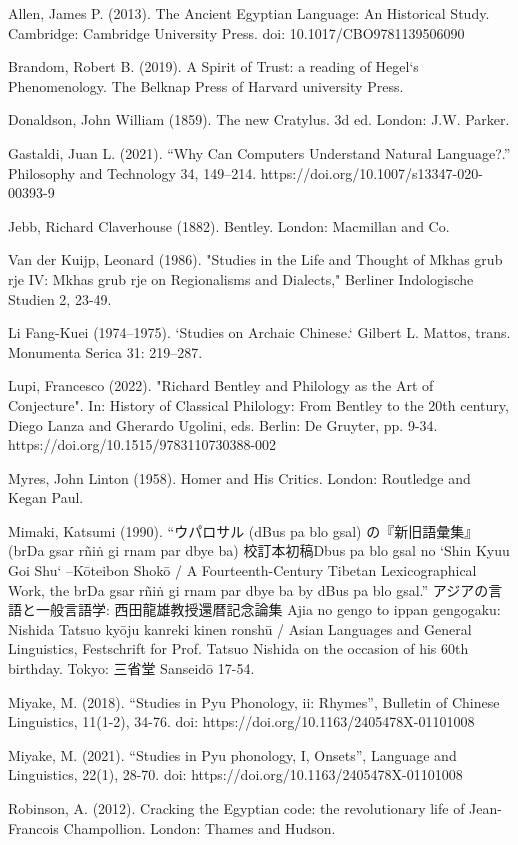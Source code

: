 Allen, James P. (2013). The Ancient Egyptian Language: An Historical Study. Cambridge: Cambridge University Press. doi: 10.1017/CBO9781139506090

Brandom, Robert B. (2019). A Spirit of Trust: a reading of Hegel`s Phenomenology. The Belknap Press of Harvard university Press.  

Donaldson, John William (1859). The new Cratylus. 3d ed. London: J.W. Parker.

Gastaldi, Juan L. (2021). “Why Can Computers Understand Natural Language?.” Philosophy and Technology 34, 149–214. https://doi.org/10.1007/s13347-020-00393-9

Jebb, Richard Claverhouse (1882). Bentley. London: Macmillan and Co.

Van der Kuijp, Leonard (1986). "Studies in the Life and Thought of Mkhas grub rje IV: Mkhas grub rje on Regionalisms and Dialects," Berliner Indologische Studien 2, 23-49.

Li Fang-Kuei (1974–1975). `Studies on Archaic Chinese.` Gilbert L. Mattos, trans. Monumenta Serica 31: 219–287.

Lupi, Francesco (2022). "Richard Bentley and Philology as the Art of Conjecture". In: History of Classical Philology: From Bentley to the 20th century, Diego Lanza and Gherardo Ugolini, eds. Berlin: De Gruyter, pp. 9-34. https://doi.org/10.1515/9783110730388-002

Myres, John Linton (1958). Homer and His Critics. London: Routledge and Kegan Paul. 

Mimaki, Katsumi (1990). “ウパロサル (dBus pa blo gsal) の『新旧語彙集』(brDa gsar rñiṅ gi rnam par dbye ba) 校訂本初稿Dbus pa blo gsal no `Shin Kyuu Goi Shu` –Kōteibon Shokō / A Fourteenth-Century Tibetan Lexicographical Work, the brDa gsar rñiṅ gi rnam par dbye ba by dBus pa blo gsal.” アジアの言語と一般言語学: 西田龍雄教授還暦記念論集 Ajia no gengo to ippan gengogaku: Nishida Tatsuo kyōju kanreki kinen ronshū / Asian Languages and General Linguistics, Festschrift for Prof. Tatsuo Nishida on the occasion of his 60th birthday. Tokyo: 三省堂 Sanseidō 17-54.

Miyake, M. (2018). “Studies in Pyu Phonology, ii: Rhymes”, Bulletin of Chinese Linguistics, 11(1-2), 34-76. doi: https://doi.org/10.1163/2405478X-01101008

Miyake, M. (2021). “Studies in Pyu phonology, I, Onsets”, Language and Linguistics, 22(1), 28-70. doi: https://doi.org/10.1163/2405478X-01101008

Robinson, A. (2012). Cracking the Egyptian code: the revolutionary life of Jean- Francois Champollion. London: Thames and Hudson.


